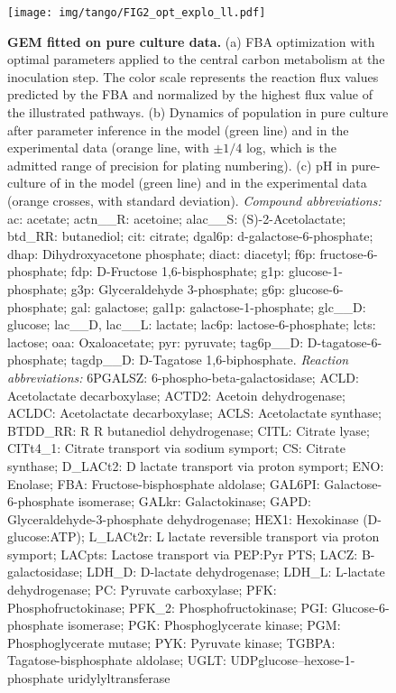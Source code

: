 \documentclass[../main.tex]{subfiles}
\begin{document}
\begin{figure}[htpb!]
    \centering
    \texttt{[image: img/tango/FIG2\_opt\_explo\_ll.pdf]}
    \caption{\textbf{\lactis GEM fitted on pure culture data.} (a) FBA optimization with optimal parameters applied to the central carbon metabolism at the inoculation step. The color scale represents the reaction flux values predicted by the FBA and normalized by the highest flux value of the illustrated pathways. (b) Dynamics of \lactis population in pure culture after parameter inference in the model (green line) and in the experimental data (orange line, with $\pm 1/4$ log, which is the admitted range of precision for plating numbering). (c) pH in pure-culture of \lactis in the model (green line) and in the experimental data (orange crosses, with standard deviation). \textit{Compound abbreviations:} ac: acetate; actn\_\_R: acetoine; alac\_\_S: (S)-2-Acetolactate; btd\_RR: butanediol; cit: citrate; dgal6p: d-galactose-6-phosphate; dhap: Dihydroxyacetone phosphate; diact: diacetyl; f6p: fructose-6-phosphate; fdp: D-Fructose 1,6-bisphosphate; g1p: glucose-1-phosphate; g3p: Glyceraldehyde 3-phosphate; g6p: glucose-6-phosphate; gal: galactose; gal1p: galactose-1-phosphate; glc\_\_D: glucose; lac\_\_D, lac\_\_L: lactate; lac6p: lactose-6-phosphate; lcts: lactose; oaa: Oxaloacetate; pyr: pyruvate; tag6p\_\_D: D-tagatose-6-phosphate; tagdp\_\_D: D-Tagatose 1,6-biphosphate. \textit{Reaction abbreviations:} 6PGALSZ: 6-phospho-beta-galactosidase; ACLD: Acetolactate decarboxylase; ACTD2: Acetoin dehydrogenase; ACLDC: Acetolactate decarboxylase; ACLS: Acetolactate synthase; BTDD\_RR:  R R  butanediol dehydrogenase; CITL: Citrate lyase; CITt4\_1: Citrate transport via sodium symport; CS: Citrate synthase; D\_LACt2: D lactate transport via proton symport; ENO: Enolase; FBA: Fructose-bisphosphate aldolase; GAL6PI: Galactose-6-phosphate isomerase; GALkr: Galactokinase; GAPD: Glyceraldehyde-3-phosphate dehydrogenase; HEX1: Hexokinase (D-glucose:ATP); L\_LACt2r: L lactate reversible transport via proton symport; LACpts: Lactose transport via PEP:Pyr PTS; LACZ: B-galactosidase; LDH\_D: D-lactate dehydrogenase; LDH\_L: L-lactate dehydrogenase; PC: Pyruvate carboxylase; PFK: Phosphofructokinase; PFK\_2: Phosphofructokinase; PGI: Glucose-6-phosphate isomerase; PGK: Phosphoglycerate kinase; PGM: Phosphoglycerate mutase; PYK: Pyruvate kinase; TGBPA: Tagatose-bisphosphate aldolase; UGLT: UDPglucose--hexose-1-phosphate uridylyltransferase}
    \label{dfba_metabolite_lactis}
\end{figure}
\end{document}
